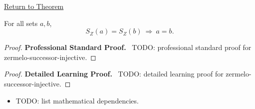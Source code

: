 \newpage
{}
\label{prf:zermelo-successor-injective}

\begin{remark*}[Return]
\hyperref[prop:zermelo-successor-injective]{Return to Theorem}
\end{remark*}

\begin{theorem*}
For all sets $a,b$,
\[
S_Z(a)=S_Z(b)\ \Rightarrow\ a=b.
\]
\end{theorem*}

\begin{proof}
\textbf{Professional Standard Proof.}~
TODO: professional standard proof for zermelo-successor-injective.
\end{proof}

\begin{proof}
\textbf{Detailed Learning Proof.}~
TODO: detailed learning proof for zermelo-successor-injective.
\end{proof}

\begin{remark*}
\end{remark*}

\begin{dependencies}
\begin{itemize}
  \item TODO: list mathematical dependencies.
\end{itemize}
\end{dependencies}

\clearpage

